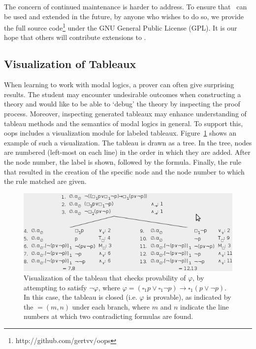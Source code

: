 The concern of continued maintenance is harder to address. To ensure that
\oops\ can be used and extended in the future, by anyone who wishes to do so,
we provide the full source code\footnote{http://github.com/gertvv/oops} under
the GNU General Public License (GPL). It is our hope that others will
contribute extensions to \oops.

\subsection{Visualization of Tableaux}

When learning to work with modal logics, a prover can often give surprising
results. The student may encounter undesirable outcomes when constructing a
theory and would like to be able to `debug' the theory by inspecting the proof
process. Moreover, inspecting generated tableaux may enhance understanding of
tableau methods and the semantics of modal logics in general.
To support this, oops includes a visualization module for labeled tableaux.
Figure~\ref{fig:tableauVis} shows an example of such a visualization. 
The tableau is drawn as a tree. In the tree, nodes are numbered (left-most on
each line) in the order in which they are added. After the node number, the
label is shown, followed by the formula. Finally, the rule that resulted in
the creation of the specific node and the node number to which the rule
matched are given.

\begin{figure}
\centering
\includegraphics[scale=.55]{images/tableauVis}
\caption{Visualization of the tableau that checks provability of $\varphi$, by
attempting to satisfy $\neg \varphi$, where
$\varphi = (\square_1 p \vee \square_1 \neg p) \to \square_1(p \vee \neg p)$.
In this case, the tableau is closed (i.e. $\varphi$ is provable), as indicated
by the $= (m, n)$ under each branch, where $m$ and $n$ indicate the line
numbers at which two contradicting formulas are found.}
\label{fig:tableauVis}
\end{figure}

